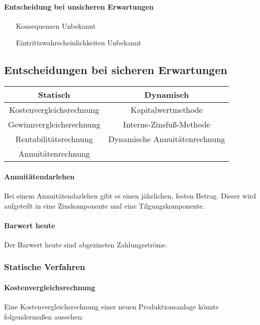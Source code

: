 \documentclass[../main.tex]{subfiles}
\begin{document}
        \paragraph{Entscheidung bei unsicheren Erwartungen}
            \begin{itemize}
                \item[Konsequenzen] Unbekannt
                \item[Eintrittswahrscheinlichkeiten] Unbekannt
            \end{itemize}
            
        \subsection{Entscheidungen bei sicheren Erwartungen}
            \begin{tabular}{cc}
              Statisch & Dynamisch\\
              \hline
              Kostenvergleichsrechnung & Kapitalwertmethode \\
              Gewinnvergleichsrechnung & Interne-Zinsfuß-Methode \\
              Rentabilitätsrechnung & Dynamische Annuitätenrechnung \\
              Annuitätenrechnung &
            \end{tabular}

            \paragraph{Annuitätendarlehen}
                Bei einem Annuitätendarlehen gibt es einen jährlichen, festen Betrag. Dieser wird aufgeteilt in eine Zinskomponente und eine Tilgungskomponente.

            \paragraph{Barwert heute}
                Der Barwert heute sind abgezinsten Zahlungsströme.
                
            \subsubsection{Statische Verfahren}
                \paragraph{Kostenvergleichsrechnung}
                    Eine Kostenvergleichsrechnung einer neuen Produktionsanlage könnte folgendermaßen aussehen:
                    
\end{document}
